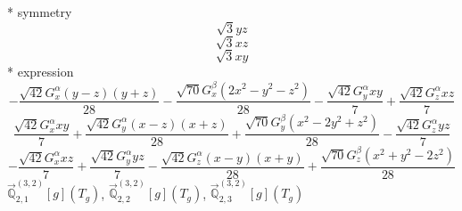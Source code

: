 \documentclass[fleqn,8pt]{jsarticle}
\begin{document}
\noindent\quad ** symmetry
\begin{dmath*}
\sqrt{3} y z
\end{dmath*}
\begin{dmath*}
\sqrt{3} x z
\end{dmath*}
\begin{dmath*}
\sqrt{3} x y
\end{dmath*}
\noindent\quad ** expression
\begin{dmath*}
- \frac{\sqrt{42} G_{x}^{\alpha} \left(y - z\right) \left(y + z\right)}{28} - \frac{\sqrt{70} G_{x}^{\beta} \left(2 x^{2} - y^{2} - z^{2}\right)}{28} - \frac{\sqrt{42} G_{y}^{\alpha} x y}{7} + \frac{\sqrt{42} G_{z}^{\alpha} x z}{7}
\end{dmath*}
\begin{dmath*}
\frac{\sqrt{42} G_{x}^{\alpha} x y}{7} + \frac{\sqrt{42} G_{y}^{\alpha} \left(x - z\right) \left(x + z\right)}{28} + \frac{\sqrt{70} G_{y}^{\beta} \left(x^{2} - 2 y^{2} + z^{2}\right)}{28} - \frac{\sqrt{42} G_{z}^{\alpha} y z}{7}
\end{dmath*}
\begin{dmath*}
- \frac{\sqrt{42} G_{x}^{\alpha} x z}{7} + \frac{\sqrt{42} G_{y}^{\alpha} y z}{7} - \frac{\sqrt{42} G_{z}^{\alpha} \left(x - y\right) \left(x + y\right)}{28} + \frac{\sqrt{70} G_{z}^{\beta} \left(x^{2} + y^{2} - 2 z^{2}\right)}{28}
\end{dmath*}
\noindent\quad $\vec{\mathbb{Q}}_{2,1}^{(3,2)}[g](T_{g})$, $\vec{\mathbb{Q}}_{2,2}^{(3,2)}[g](T_{g})$, $\vec{\mathbb{Q}}_{2,3}^{(3,2)}[g](T_{g})$
\end{document}
